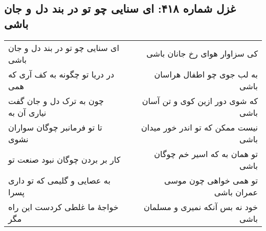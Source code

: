 \begin{center}
\section*{غزل شماره ۴۱۸: ای سنایی چو تو در بند دل و جان باشی}
\label{sec:418}
\begin{longtable}{l p{0.5cm} r}
ای سنایی چو تو در بند دل و جان باشی
&&
کی سزاوار هوای رخ جانان باشی
\\
در دریا تو چگونه به کف آری که همی
&&
به لب جوی چو اطفال هراسان باشی
\\
چون به ترک دل و جان گفت نیاری آن به
&&
که شوی دور ازین کوی و تن آسان باشی
\\
تا تو فرمانبر چوگان سواران نشوی
&&
نیست ممکن که تو اندر خور میدان باشی
\\
کار بر بردن چوگان نبود صنعت تو
&&
تو همان به که اسیر خم چوگان باشی
\\
به عصایی و گلیمی که تو داری پسرا
&&
تو همی خواهی چون موسی عمران باشی
\\
خواجهٔ ما غلطی کردست این راه مگر
&&
خود نه بس آنکه نمیری و مسلمان باشی
\\
\end{longtable}
\end{center}
